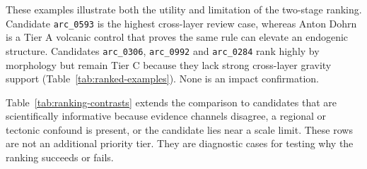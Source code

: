 \documentclass[11pt]{article}
\begin{document}
These examples illustrate both the utility and limitation of the two-stage ranking. Candidate \texttt{arc\_0593} is the highest cross-layer review case, whereas Anton Dohrn is a Tier A volcanic control that proves the same rule can elevate an endogenic structure. Candidates \texttt{arc\_0306}, \texttt{arc\_0992} and \texttt{arc\_0284} rank highly by morphology but remain Tier C because they lack strong cross-layer gravity support (Table~\ref{tab:ranked-examples}). None is an impact confirmation.

\begin{table}[H]
\centering
\caption{Summary of the illustrated morphology-ranked candidates. Gravity and magnetic values are percentiles within the operational domain/scale comparisons; higher values indicate stronger relative screening evidence, not impact probability.}
\label{tab:ranked-examples}
\small
{}
\end{table}

\clearpage
Table~\ref{tab:ranking-contrasts} extends the comparison to candidates that are scientifically informative because evidence channels disagree, a regional or tectonic confound is present, or the candidate lies near a scale limit. These rows are not an additional priority tier. They are diagnostic cases for testing why the ranking succeeds or fails.
\end{document}
